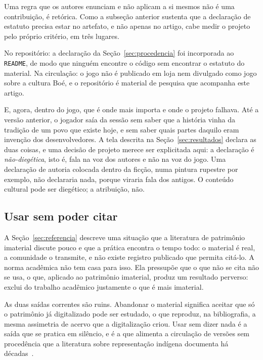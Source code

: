 \documentclass[conference]{IEEEtran}
\begin{document}
Uma regra que os autores enunciam e não aplicam a si mesmos não é uma contribuição, é
retórica. Como a subseção anterior sustenta que a declaração de estatuto precisa estar no
artefato, e não apenas no artigo, cabe medir o projeto pelo próprio critério, em três
lugares.

No repositório: a declaração da Seção~\ref{sec:procedencia} foi incorporada ao
\texttt{README}, de modo que ninguém encontre o código sem encontrar o estatuto do
material. Na circulação: o jogo não é publicado em loja nem divulgado como jogo sobre a
cultura Boé, e o repositório é material de pesquisa que acompanha este artigo.

E, agora, dentro do jogo, que é onde mais importa e onde o projeto falhava. Até a versão
anterior, o jogador saía da sessão sem saber que a história vinha da tradição de um povo
que existe hoje, e sem saber quais partes daquilo eram invenção dos desenvolvedores. A
tela descrita na Seção~\ref{sec:resultados} declara as duas coisas, e uma decisão de
projeto merece ser explicitada aqui: a declaração é \emph{não-diegética}, isto é, fala na
voz dos autores e não na voz do jogo. Uma declaração de autoria colocada dentro da ficção,
numa pintura rupestre por exemplo, não declararia nada, porque viraria fala dos antigos. O
conteúdo cultural pode ser diegético; a atribuição, não.

\subsection{Usar sem poder citar}

A Seção~\ref{sec:referencia} descreve uma situação que a literatura de patrimônio
imaterial discute pouco e que a prática encontra o tempo todo: o material é real, a
comunidade o transmite, e não existe registro publicado que permita citá-lo. A norma
acadêmica não tem casa para isso. Ela pressupõe que o que não se cita não se usa, o que,
aplicado ao patrimônio imaterial, produz um resultado perverso: exclui do trabalho
acadêmico justamente o que é mais imaterial.

As duas saídas correntes são ruins. Abandonar o material significa aceitar que só o
patrimônio já digitalizado pode ser estudado, o que reproduz, na bibliografia, a mesma
assimetria de acervo que a digitalização criou. Usar sem dizer nada é a saída que se
pratica em silêncio, e é a que alimenta a circulação de versões sem procedência que a
literatura sobre representação indígena documenta há
décadas~\cite{wallis2023,martinsneto2024}.
\end{document}
